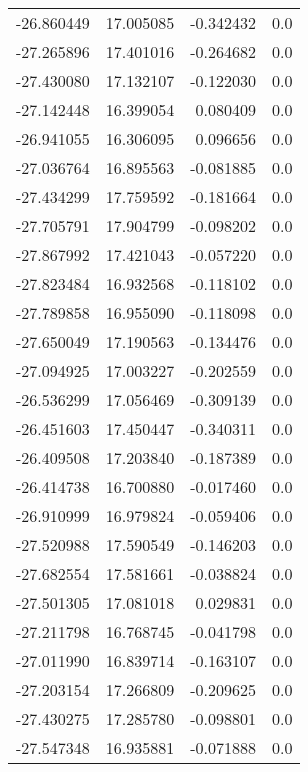 \begin{tabular}{rrrr}
      -26.860449 &        17.005085 &   -0.342432 &   0.0 \\
      -27.265896 &        17.401016 &   -0.264682 &   0.0 \\
      -27.430080 &        17.132107 &   -0.122030 &   0.0 \\
      -27.142448 &        16.399054 &    0.080409 &   0.0 \\
      -26.941055 &        16.306095 &    0.096656 &   0.0 \\
      -27.036764 &        16.895563 &   -0.081885 &   0.0 \\
      -27.434299 &        17.759592 &   -0.181664 &   0.0 \\
      -27.705791 &        17.904799 &   -0.098202 &   0.0 \\
      -27.867992 &        17.421043 &   -0.057220 &   0.0 \\
      -27.823484 &        16.932568 &   -0.118102 &   0.0 \\
      -27.789858 &        16.955090 &   -0.118098 &   0.0 \\
      -27.650049 &        17.190563 &   -0.134476 &   0.0 \\
      -27.094925 &        17.003227 &   -0.202559 &   0.0 \\
      -26.536299 &        17.056469 &   -0.309139 &   0.0 \\
      -26.451603 &        17.450447 &   -0.340311 &   0.0 \\
      -26.409508 &        17.203840 &   -0.187389 &   0.0 \\
      -26.414738 &        16.700880 &   -0.017460 &   0.0 \\
      -26.910999 &        16.979824 &   -0.059406 &   0.0 \\
      -27.520988 &        17.590549 &   -0.146203 &   0.0 \\
      -27.682554 &        17.581661 &   -0.038824 &   0.0 \\
      -27.501305 &        17.081018 &    0.029831 &   0.0 \\
      -27.211798 &        16.768745 &   -0.041798 &   0.0 \\
      -27.011990 &        16.839714 &   -0.163107 &   0.0 \\
      -27.203154 &        17.266809 &   -0.209625 &   0.0 \\
      -27.430275 &        17.285780 &   -0.098801 &   0.0 \\
      -27.547348 &        16.935881 &   -0.071888 &   0.0 \\

\end{tabular}
